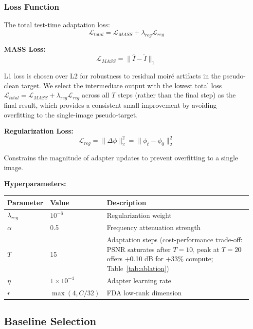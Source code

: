 \documentclass[review,10pt]{elsarticle}
\begin{document}
\subsubsection{Loss Function}

The total test-time adaptation loss:
\begin{equation}
\mathcal{L}_{total} = \mathcal{L}_{MASS} + \lambda_{reg} \mathcal{L}_{reg}
\end{equation}

\textbf{MASS Loss:}
\begin{equation}
\mathcal{L}_{MASS} = \|\hat{I} - \tilde{I}\|_1
\end{equation}

L1 loss is chosen over L2 for robustness to residual moir\'{e} artifacts in the pseudo-clean target. We select the intermediate output with the lowest total loss $\mathcal{L}_{total} = \mathcal{L}_{MASS} + \lambda_{reg}\mathcal{L}_{reg}$ across all $T$ steps (rather than the final step) as the final result, which provides a consistent small improvement by avoiding overfitting to the single-image pseudo-target.

\textbf{Regularization Loss:}
\begin{equation}
\mathcal{L}_{reg} = \|\Delta\phi\|_2^2 = \|\phi_t - \phi_0\|_2^2
\end{equation}

Constrains the magnitude of adapter updates to prevent overfitting to a single image.

\textbf{Hyperparameters:}
\begin{center}
\footnotesize
\begin{tabular}{@{}llp{5.5cm}@{}}
\toprule
Parameter & Value & Description \\
\midrule
$\lambda_{reg}$ & $10^{-6}$ & Regularization weight \\
$\alpha$ & 0.5 & Frequency attenuation strength \\
$T$ & 15 & Adaptation steps (cost-performance trade-off: PSNR saturates after $T{=}10$, peak at $T{=}20$ offers +0.10 dB for +33\% compute; Table~\ref{tab:ablation}) \\
$\eta$ & $1 \times 10^{-4}$ & Adapter learning rate \\
$r$ & $\max(4, C/32)$ & FDA low-rank dimension \\
\bottomrule
\end{tabular}
\end{center}

\subsection{Baseline Selection}
\end{document}

